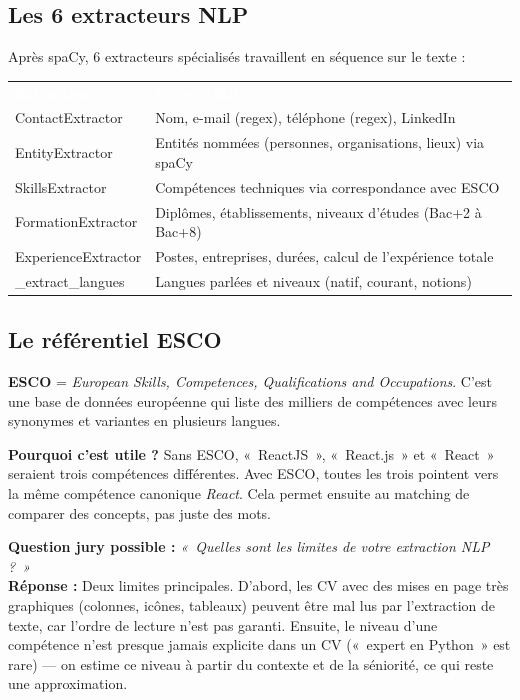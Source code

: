 \documentclass[12pt,a4paper]{article}
\newenvironment{simplification}{%
  \def\FrameCommand{\fboxsep=8pt\colorbox{green!10}}%
  \MakeFramed{\advance\hsize-\width \FrameRestore}%
  \vspace{-4pt}%
}{\endMakeFramed}
\newenvironment{jury}{%
  \def\FrameCommand{\fboxsep=8pt\colorbox{orange!12}}%
  \MakeFramed{\advance\hsize-\width \FrameRestore}%
  \vspace{-4pt}%
}{\endMakeFramed}
\newcommand{\concept}[1]{\textbf{\color{bleu}#1}}
\begin{document}
\subsection{Les 6 extracteurs NLP}

Après spaCy, 6 extracteurs spécialisés travaillent en séquence sur le texte :

\begin{tabularx}{\textwidth}{p{3.5cm} X}
\rowcolor{bleu}
\textcolor{white}{\textbf{Extracteur}} & \textcolor{white}{\textbf{Ce qu'il fait}} \\
ContactExtractor & Nom, e-mail (regex), téléphone (regex), LinkedIn \\
\rowcolor{bleulight}
EntityExtractor & Entités nommées (personnes, organisations, lieux) via spaCy \\
SkillsExtractor & Compétences techniques via correspondance avec ESCO \\
\rowcolor{bleulight}
FormationExtractor & Diplômes, établissements, niveaux d'études (Bac+2 à Bac+8) \\
ExperienceExtractor & Postes, entreprises, durées, calcul de l'expérience totale \\
\rowcolor{bleulight}
\_extract\_langues & Langues parlées et niveaux (natif, courant, notions) \\
\bottomrule
\end{tabularx}

\subsection{Le référentiel ESCO}

\concept{ESCO} = \textit{European Skills, Competences, Qualifications and Occupations}. C'est une base de données européenne qui liste des milliers de compétences avec leurs synonymes et variantes en plusieurs langues.

\begin{simplification}
\textbf{Pourquoi c'est utile ?} Sans ESCO, «~ReactJS~», «~React.js~» et «~React~» seraient trois compétences différentes. Avec ESCO, toutes les trois pointent vers la même compétence canonique \textit{React}. Cela permet ensuite au matching de comparer des concepts, pas juste des mots.
\end{simplification}

\begin{jury}
\textbf{Question jury possible :} \textit{«~Quelles sont les limites de votre extraction NLP ?~»}\\[4pt]
\textbf{Réponse :} Deux limites principales. D'abord, les CV avec des mises en page très graphiques (colonnes, icônes, tableaux) peuvent être mal lus par l'extraction de texte, car l'ordre de lecture n'est pas garanti. Ensuite, le niveau d'une compétence n'est presque jamais explicite dans un CV («~expert en Python~» est rare) — on estime ce niveau à partir du contexte et de la séniorité, ce qui reste une approximation.
\end{jury}
\end{document}
